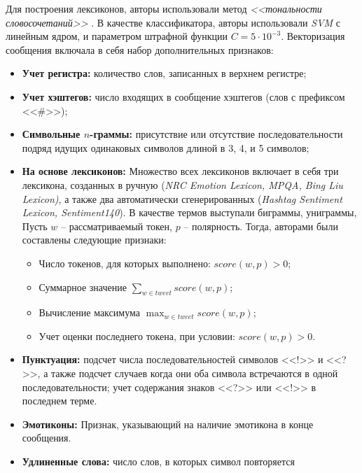     Для построения лексиконов, авторы использовали метод {\it <<тональности словосочетаний>>}
    \cite{lexiconSO}.
    В качестве классификатора, авторы использовали {\it SVM} с линейным ядром, и
    параметром штрафной функции $C = 5\cdot 10^{-3}$.
    Векторизация сообщения включала в себя набор дополнительных признаков:
    \begin{itemize}
        \item {\bf Учет регистра:} количество слов, записанных в верхнем регистре;
        \item {\bf Учет хэштегов:} число входящих в сообщение хэштегов (слов с префиксом <<\#>>);
        \item {\bf Символьные $n$-граммы:} присутствие или отсутствие последовательности
            подряд идущих одинаковых символов длиной в 3, 4, и 5 символов;
        \item {\bf На основе лексиконов:}
            Множество всех лексиконов включает в себя три лексикона, созданных
            в ручную ({\it NRC Emotion Lexicon, MPQA, Bing Liu Lexicon)}, а также
            два автоматически сгенерированных ({\it Hashtag Sentiment Lexicon,
            Sentiment140}). В качестве термов выступали биграммы, униграммы,
            Пусть $w$ -- рассматриваемый токен, $p$ -- полярность. Тогда,
            авторами были составлены следующие признаки:%
            \begin{itemize}
                \item Число токенов, для которых выполнено: $score(w, p) > 0$;
                \item Суммарное значение $\sum_{w \in tweet} score(w,p)$;
                \item Вычисление максимума $\max_{w \in tweet} score(w,p)$;
                \item Учет оценки последнего токена, при условии: $score(w,p) > 0$.
            \end{itemize}
        \item {\bf Пунктуация:}
                подсчет числа последовательностей символов <<!>> и <<?>>,
                а также подсчет случаев когда они оба символа встречаются в одной
                последовательности;
                учет содержания знаков <<?>> или <<!>> в последнем терме.
        \item {\bf Эмотиконы:}
                Признак, указывающий на наличие эмотикона в конце сообщения.
        \item {\bf Удлиненные слова:} число слов, в которых символ повторяется

\end{itemize}
